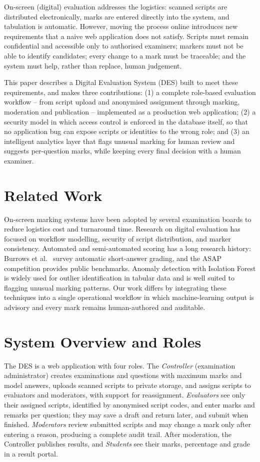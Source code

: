 \documentclass[conference]{IEEEtran}
\begin{document}
On-screen (digital) evaluation addresses the logistics: scanned scripts are distributed electronically, marks are entered directly into the system, and tabulation is automatic. However, moving the process online introduces new requirements that a naive web application does not satisfy. Scripts must remain confidential and accessible only to authorised examiners; markers must not be able to identify candidates; every change to a mark must be traceable; and the system must help, rather than replace, human judgement.

This paper describes a Digital Evaluation System (DES) built to meet these requirements, and makes three contributions: (1) a complete role-based evaluation workflow -- from script upload and anonymised assignment through marking, moderation and publication -- implemented as a production web application; (2) a security model in which access control is enforced in the database itself, so that no application bug can expose scripts or identities to the wrong role; and (3) an intelligent analytics layer that flags unusual marking for human review and suggests per-question marks, while keeping every final decision with a human examiner.

\section{Related Work}
On-screen marking systems have been adopted by several examination boards to reduce logistics cost and turnaround time. Research on digital evaluation has focused on workflow modelling, security of script distribution, and marker consistency. Automated and semi-automated scoring has a long research history: Burrows et al.\ \cite{burrows2015} survey automatic short-answer grading, and the ASAP competition \cite{shermis2014} provides public benchmarks. Anomaly detection with Isolation Forest \cite{liu2008} is widely used for outlier identification in tabular data and is well suited to flagging unusual marking patterns. Our work differs by integrating these techniques into a single operational workflow in which machine-learning output is advisory and every mark remains human-authored and auditable.

\section{System Overview and Roles}
The DES is a web application with four roles. The \emph{Controller} (examination administrator) creates examinations and questions with maximum marks and model answers, uploads scanned scripts to private storage, and assigns scripts to evaluators and moderators, with support for reassignment. \emph{Evaluators} see only their assigned scripts, identified by anonymised script codes, and enter marks and remarks per question; they may save a draft and return later, and submit when finished. \emph{Moderators} review submitted scripts and may change a mark only after entering a reason, producing a complete audit trail. After moderation, the Controller publishes results, and \emph{Students} see their marks, percentage and grade in a result portal.
\end{document}
